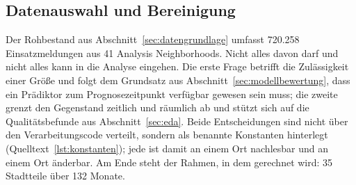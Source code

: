 %
%
%
%



\subsection{Datenauswahl und Bereinigung}
\label{sec:auswahl-bereinigung}

Der Rohbestand aus Abschnitt~\ref{sec:datengrundlage} umfasst 720.258
Einsatzmeldungen aus 41 Analysis Neighborhoods. Nicht alles davon darf und
nicht alles kann in die Analyse eingehen. Die erste Frage betrifft die
Zulässigkeit einer Größe und folgt dem Grundsatz aus
Abschnitt~\ref{sec:modellbewertung}, dass ein Prädiktor zum Prognosezeitpunkt
verfügbar gewesen sein muss; die zweite grenzt den Gegenstand zeitlich und
räumlich ab und stützt sich auf die Qualitätsbefunde aus
Abschnitt~\ref{sec:eda}. Beide Entscheidungen sind nicht über den
Verarbeitungscode verteilt, sondern als benannte Konstanten hinterlegt
(Quelltext~\ref{lst:konstanten}); jede ist damit an einem Ort nachlesbar und an
einem Ort änderbar. Am Ende steht der Rahmen, in dem gerechnet wird: 35
Stadtteile über 132 Monate.

